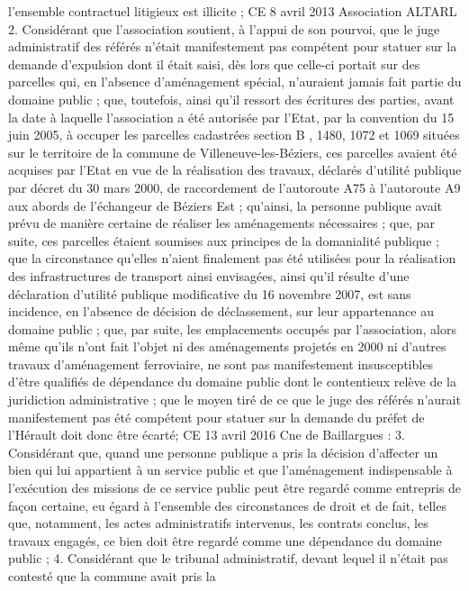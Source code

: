 \documentclass[11pt,a4paper]{report}
\begin{document}
l'ensemble contractuel litigieux est illicite ;
CE 8 avril 2013 Association ALTARL 
2. Considérant que l'association soutient, à l'appui de son pourvoi, que le juge administratif des référés n'était
manifestement pas compétent pour statuer sur la demande d'expulsion dont il était saisi, dès lors que celle-ci
portait sur des parcelles qui, en l'absence d'aménagement spécial, n'auraient jamais fait partie du domaine
public ; que, toutefois, ainsi qu'il ressort des écritures des parties, avant la date à laquelle l'association a été
autorisée par l'Etat, par la convention du 15 juin 2005, à occuper les parcelles cadastrées section B ,
1480, 1072 et 1069 situées sur le territoire de la commune de Villeneuve-les-Béziers, ces parcelles avaient été
acquises par l'Etat en vue de la réalisation des travaux, déclarés d'utilité publique par décret du 30 mars 2000,
de raccordement de l'autoroute A75 à l'autoroute A9 aux abords de l'échangeur de Béziers Est ; qu'ainsi, la
personne publique avait prévu de manière certaine de réaliser les aménagements nécessaires ; que, par suite,
ces parcelles étaient soumises aux principes de la domanialité publique ; que la circonstance qu'elles n'aient
finalement pas été utilisées pour la réalisation des infrastructures de transport ainsi envisagées, ainsi qu'il
résulte d'une déclaration d'utilité publique modificative du 16 novembre 2007, est sans incidence, en l'absence
de décision de déclassement, sur leur appartenance au domaine public ; que, par suite, les emplacements
occupés par l'association, alors même qu'ils n'ont fait l'objet ni des aménagements projetés en 2000 ni d'autres
travaux d'aménagement ferroviaire, ne sont pas manifestement insusceptibles d'être qualifiés de dépendance du
domaine public dont le contentieux relève de la juridiction administrative ; que le moyen tiré de ce que le juge
des référés n'aurait manifestement pas été compétent pour statuer sur la demande du préfet de l'Hérault doit
donc être écarté;
CE 13 avril 2016  Cne de Baillargues : 3. Considérant que, quand une personne publique a pris la
décision d'affecter un bien qui lui appartient à un service public et que l'aménagement indispensable à
l'exécution des missions de ce service public peut être regardé comme entrepris de façon certaine, eu égard à
l'ensemble des circonstances de droit et de fait, telles que, notamment, les actes administratifs intervenus, les
contrats conclus, les travaux engagés, ce bien doit être regardé comme une dépendance du domaine public ;
4. Considérant que le tribunal administratif, devant lequel il n'était pas contesté que la commune avait pris la
\end{document}
